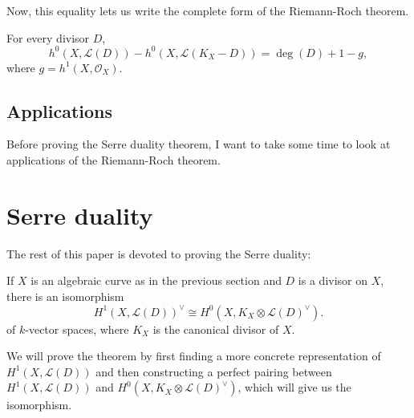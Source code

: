 \documentclass[12pt]{article}
\begin{document}
Now, this equality lets us write the complete form of the Riemann-Roch
theorem.
\begin{thm}\label{thm:riemann_roch_complete}
  For every divisor $D$,
  \[
    h^{0}(X, \mathcal{L}(D))-h^{0}(X, \mathcal{L}(K_{X}-D))=\deg(D)+1-g,
  \]
  where $g=h^{1}(X, \mathcal{O}_{X})$.
\end{thm}

\subsection{Applications}
Before proving the Serre duality theorem, I want to take some time to
look at applications of the Riemann-Roch theorem.

\section{Serre duality}
The rest of this paper is devoted to proving the Serre duality:
\begin{thm}
  If $X$ is an algebraic curve as in the previous section
  and $D$ is a divisor on $X$, there is an isomorphism
  \[
    H^{1}(X, \mathcal{L}(D))^{\vee}\cong H^{0}(X, K_{X}
    \otimes \mathcal{L}(D)^{\vee}).
  \]
  of $k$-vector spaces, where $K_{X}$ is the canonical divisor of $X$.
\end{thm}
We will prove the theorem by first finding a more concrete representation of
$H^{1}(X,\mathcal{L}(D))$ and then constructing a perfect pairing between
$H^{1}(X,\mathcal{L}(D))$ and $H^{0}(X,K_{X}\otimes\mathcal{L}(D)^{\vee})$,
which will give us the isomorphism.
\end{document}
